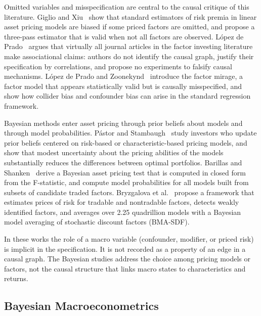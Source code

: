   Omitted variables and misspecification are central to the causal critique of
  this literature. Giglio and Xiu~\cite{giglio2021asset} show that standard estimators of risk
  premia in linear asset pricing models are biased if some priced factors are
  omitted, and propose a three-pass estimator that is valid when not all
  factors are observed. L{\'o}pez de Prado~\cite{lopezdeprado2023causal} argues that virtually all
  journal articles in the factor investing literature make associational
  claims: authors do not identify the causal graph, justify their
  specification by correlations, and propose no experiments to falsify causal
  mechanisms. L{\'o}pez de Prado and Zoonekynd~\cite{lopezdeprado2025primer} introduce the factor mirage, a
  factor model that appears statistically valid but is causally misspecified,
  and show how collider bias and confounder bias can arise in the standard
  regression framework.

  Bayesian methods enter asset pricing through prior beliefs about models and
  through model probabilities. P{\'a}stor and Stambaugh~\cite{pastor2000comparing} study investors who
  update prior beliefs centered on risk-based or characteristic-based pricing
  models, and show that modest uncertainty about the pricing abilities of the
  models substantially reduces the differences between optimal portfolios.
  Barillas and Shanken~\cite{barillas2018comparing} derive a Bayesian asset pricing test that is
  computed in closed form from the F-statistic, and compute model probabilities
  for all models built from subsets of candidate traded factors.
  Bryzgalova et al.~\cite{bryzgalova2023bayesian} propose a framework that estimates prices of
  risk for tradable and nontradable factors, detects weakly identified
  factors, and averages over 2.25 quadrillion models with a Bayesian model
  averaging of stochastic discount factors (BMA-SDF).

  In these works the role of a macro variable (confounder, modifier, or priced
  risk) is implicit in the specification. It is not recorded as a property of
  an edge in a causal graph. The Bayesian studies address the choice among
  pricing models or factors, not the causal structure that links macro states
  to characteristics and returns.

  \subsection{Bayesian Macroeconometrics}\label{sec:sota_bayesian_macro}


